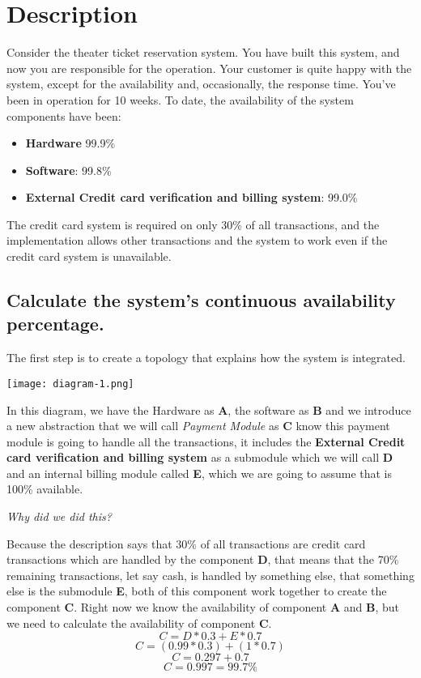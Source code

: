 \section{Description}
Consider the theater ticket reservation system.  You have built this system, 
and now you are responsible for the operation.  Your customer is quite happy 
with the system, except for the availability and, occasionally, the response 
time.  You’ve been in operation for 10 weeks.  To date, the availability of the
system components have been:
\begin{itemize}
    \item \textbf{Hardware} 99.9\%
    \item \textbf{Software}: 99.8\%
    \item \textbf{External Credit card verification and billing system}: 99.0\%
\end{itemize}
\noindent
The credit card system is required on only 30\% of all transactions, and the 
implementation allows other transactions and the system to work even if the 
credit card system is unavailable.

\pagebreak

\subsection{Calculate the system’s continuous availability percentage.}
The first step is to create a topology that explains how the system is integrated.
\begin{center}
    \texttt{[image: diagram-1.png]}    
\end{center}
\noindent
In this diagram, we have the Hardware as \textbf{A}, the software as \textbf{B} 
and we introduce a new abstraction that we will call \textit{Payment Module} as 
\textbf{C} know this payment module is going to handle all the transactions, it 
includes the \textbf{External Credit card verification and billing system} as a
submodule which we will call \textbf{D} and an internal billing module called 
\textbf{E}, which we are going to assume that is 100\% available. \newline\newline
\pagebreak

\noindent
\textit{Why did we did this?}\newline\newline

\noindent
Because the description says that 30\% of all transactions 
are credit card transactions which are handled by the component \textbf{D}, that 
means that the 70\% remaining transactions, let say cash, is handled 
by something else, that something else is the submodule \textbf{E}, both of 
this component work together to create the 
component \textbf{C}.\newline\newline
\noindent
Right now we know the availability of component \textbf{A} and \textbf{B}, but 
we need to calculate the availability of component \textbf{C}.
\[ C = D * 0.3 + E * 0.7 \]
\[ C = (0.99 * 0.3) + (1 * 0.7) \]
\[ C =  0.297 + 0.7 \]
\[ C =  0.997 = 99.7\% \]

